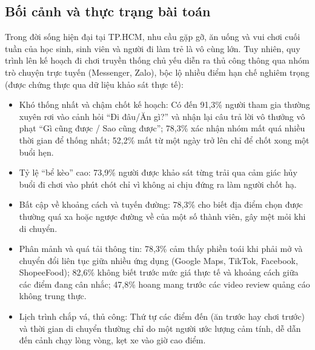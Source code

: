 \documentclass[13pt,a4paper]{extreport}
\begin{document}
\subsection{Bối cảnh và thực trạng bài toán}
Trong đời sống hiện đại tại TP.HCM, nhu cầu gặp gỡ, ăn uống và vui chơi cuối tuần của học sinh, sinh viên và người đi làm trẻ là vô cùng lớn. Tuy nhiên, quy trình lên kế hoạch đi chơi truyền thống chủ yếu diễn ra thủ công thông qua nhóm trò chuyện trực tuyến (Messenger, Zalo), bộc lộ nhiều điểm hạn chế nghiêm trọng (được chứng thực qua dữ liệu khảo sát thực tế):
\begin{itemize}
    \item Khó thống nhất và chậm chốt kế hoạch: Có đến 91,3\% người tham gia thường xuyên rơi vào cảnh hỏi ``Đi đâu/Ăn gì?'' và nhận lại câu trả lời vô thưởng vô phạt ``Gì cũng được / Sao cũng được''; 78,3\% xác nhận nhóm mất quá nhiều thời gian để thống nhất; 52,2\% mất từ một ngày trở lên chỉ để chốt xong một buổi hẹn.
    \item Tỷ lệ ``bể kèo'' cao: 73,9\% người được khảo sát từng trải qua cảm giác hủy buổi đi chơi vào phút chót chỉ vì không ai chịu đứng ra làm người chốt hạ.
    \item Bất cập về khoảng cách và tuyến đường: 78,3\% cho biết địa điểm chọn được thường quá xa hoặc ngược đường về của một số thành viên, gây mệt mỏi khi di chuyển.
    \item Phân mảnh và quá tải thông tin: 78,3\% cảm thấy phiền toái khi phải mở và chuyển đổi liên tục giữa nhiều ứng dụng (Google Maps, TikTok, Facebook, ShopeeFood); 82,6\% không biết trước mức giá thực tế và khoảng cách giữa các điểm đang cân nhắc; 47,8\% hoang mang trước các video review quảng cáo không trung thực.
    \item Lịch trình chắp vá, thủ công: Thứ tự các điểm đến (ăn trước hay chơi trước) và thời gian di chuyển thường chỉ do một người ước lượng cảm tính, dễ dẫn đến cảnh chạy lòng vòng, kẹt xe vào giờ cao điểm.
\end{itemize}
\end{document}

